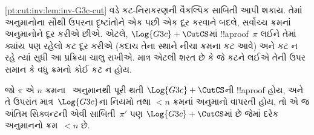 \documentclass[../../../include/open-logic-section]{subfiles}
\begin{document}
\cref{pt:cut:inv:lem:inv-G3c-cut} વડે કટ-નિરાકરણની
વૈકલ્પિક સાબિતી આપી શકાય. તેમાં \CutCS{}
અનુમાનોના સૌથી ઉપરના દૃષ્ટાંતોને એક પછી એક
દૂર કરવાને બદલે, સર્વોચ્ચ ક્રમનાં \CutCS{}
અનુમાનોને દૂર કરીએ છીએ. એટલે,
$\Log{G3c} + \CutCS$માં !!a{proof}~$\pi$ લઈને
તેમાં ક્યાંય પણ રહેલો કટ દૂર કરીએ
(કદાચ તેના સ્થાને નીચા ક્રમના કટ આવે)
અને કટ ન રહે ત્યાં સુધી આ પ્રક્રિયા ચાલુ રાખીએ.
માત્ર એટલી શરત છે કે જે કટને લઈએ તેની ઉપર
સમાન કે વધુ ક્રમનો કોઈ કટ ન હોય.

\begin{lem}
જો $\pi$ એ $n$ ક્રમના~\CutCS{} અનુમાનથી પૂરી થતી
$\Log{G3c}+\CutCS$ની !!a{proof} હોય, અને તે ઉપરાંત
માત્ર~$\Log{G3c}$ના નિયમો તથા $<n$ ક્રમનાં
\CutCS{} અનુમાનો વાપરતી હોય, તો એ જ અંતિમ
સિક્વન્ટની એવી સાબિતી~$\pi'$ પણ
$\Log{G3c} + \CutCS$માં છે જેમાં દરેક
\CutCS{} અનુમાનનો ક્રમ~$<n$ છે.
\end{lem}
\end{document}
